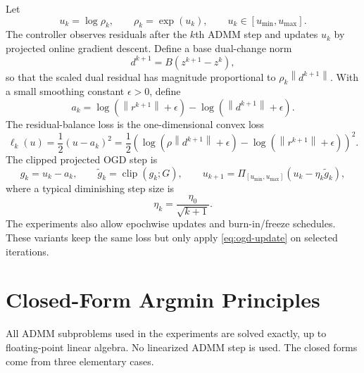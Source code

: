 \documentclass[11pt]{article}
\newcommand{\norm}[1]{\left\lVert #1 \right\rVert}
\begin{document}
Let
\begin{equation}
    u_k=\log \rho_k,
    \qquad
    \rho_k=\exp(u_k),
    \qquad
    u_k \in [u_{\min},u_{\max}].
\end{equation}
The controller observes residuals after the $k$th ADMM step and updates
$u_k$ by projected online gradient descent.  Define a base dual-change norm
\begin{equation}
    d^{k+1}=B(z^{k+1}-z^k),
\end{equation}
so that the scaled dual residual has magnitude proportional to
$\rho_k\norm{d^{k+1}}$.  With a small smoothing constant $\epsilon>0$,
define
\begin{equation}
    a_k
    =
    \log(\norm{r^{k+1}}+\epsilon)
    -
    \log(\norm{d^{k+1}}+\epsilon).
\end{equation}
The residual-balance loss is the one-dimensional convex loss
\begin{equation}
    \ell_k(u)
    =
    \frac{1}{2}(u-a_k)^2
    =
    \frac{1}{2}
    \left(
        \log(\rho\norm{d^{k+1}}+\epsilon)
        -
        \log(\norm{r^{k+1}}+\epsilon)
    \right)^2.
    \label{eq:online-loss}
\end{equation}
The clipped projected OGD step is
\begin{equation}
    g_k = u_k-a_k,
    \qquad
    \widetilde{g}_k
    =
    \operatorname{clip}(g_k;G),
    \qquad
    u_{k+1}
    =
    \Pi_{[u_{\min},u_{\max}]}
    \left(u_k-\eta_k\widetilde{g}_k\right),
    \label{eq:ogd-update}
\end{equation}
where a typical diminishing step size is
\begin{equation}
    \eta_k = \frac{\eta_0}{\sqrt{k+1}}.
\end{equation}
The experiments also allow epochwise updates and burn-in/freeze schedules.
These variants keep the same loss but only apply \eqref{eq:ogd-update} on
selected iterations.

\section{Closed-Form Argmin Principles}

All ADMM subproblems used in the experiments are solved exactly, up to
floating-point linear algebra.  No linearized ADMM step is used.  The closed
forms come from three elementary cases.
\end{document}
